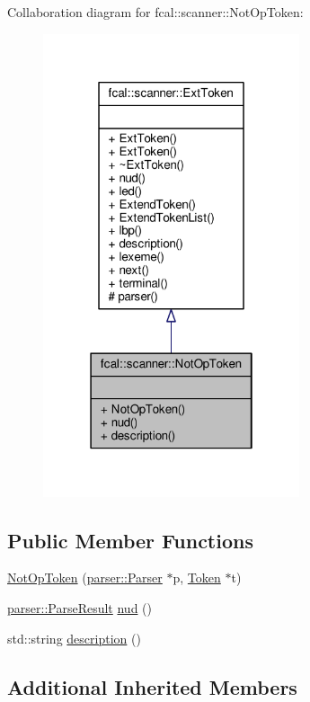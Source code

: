 Collaboration diagram for fcal\+:\+:scanner\+:\+:Not\+Op\+Token\+:
\nopagebreak
\begin{figure}[H]
\begin{center}
\leavevmode
\includegraphics[width=214pt]{classfcal_1_1scanner_1_1NotOpToken__coll__graph}
\end{center}
\end{figure}
\subsection*{Public Member Functions}
\begin{DoxyCompactItemize}
\item 
\hyperlink{classfcal_1_1scanner_1_1NotOpToken_addec5b73aa06a1b13a870f9c620614c0}{Not\+Op\+Token} (\hyperlink{classfcal_1_1parser_1_1Parser}{parser\+::\+Parser} $\ast$p, \hyperlink{classfcal_1_1scanner_1_1Token}{Token} $\ast$t)
\item 
\hyperlink{classfcal_1_1parser_1_1ParseResult}{parser\+::\+Parse\+Result} \hyperlink{classfcal_1_1scanner_1_1NotOpToken_a4fe82b09660e6f180319786cbe0428bc}{nud} ()
\item 
std\+::string \hyperlink{classfcal_1_1scanner_1_1NotOpToken_ae56a9526025d994262cf83879e0c2533}{description} ()
\end{DoxyCompactItemize}
\subsection*{Additional Inherited Members}


